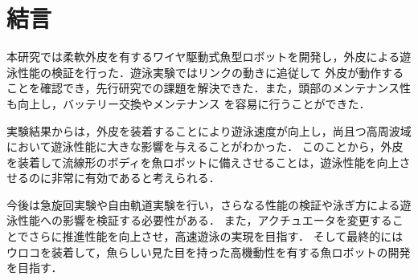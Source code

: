 \newpage
\section{結言}
本研究では柔軟外皮を有するワイヤ駆動式魚型ロボットを開発し，外皮による遊泳性能の検証を行った．遊泳実験ではリンクの動きに追従して
外皮が動作することを確認でき，先行研究\cite{kyu}での課題を解決できた．また，頭部のメンテナンス性も向上し，バッテリー交換やメンテナンス
を容易に行うことができた．

実験結果からは，外皮を装着することにより遊泳速度が向上し，尚且つ高周波域において遊泳性能に大きな影響を与えることがわかった．
このことから，外皮を装着して流線形のボディを魚ロボットに備えさせることは，遊泳性能を向上させるのに非常に有効であると考えられる．

今後は急旋回実験や自由軌道実験を行い，さらなる性能の検証や泳ぎ方による遊泳性能への影響を検証する必要性がある．
また，アクチュエータを変更することでさらに推進性能を向上させ，高速遊泳の実現を目指す．
そして最終的にはウロコを装着して，魚らしい見た目を持った高機動性を有する魚ロボットの開発を目指す．
